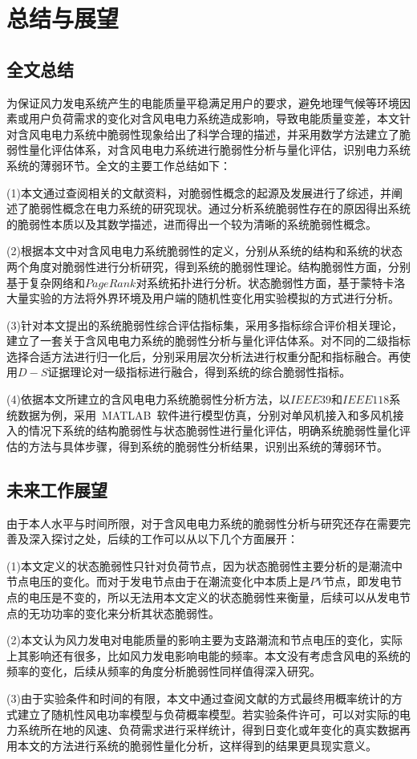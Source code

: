\chapter{总结与展望}
\label{cha:summery}

\section{全文总结}
\label{sec:sum}
为保证风力发电系统产生的电能质量平稳满足用户的要求，避免地理气候等环境因素或用户负荷需求的变化对含风电电力系统造成影响，导致电能质量变差，本文针对含风电电力系统中脆弱性现象给出了科学合理的描述，并采用数学方法建立了脆弱性量化评估体系，对含风电电力系统进行脆弱性分析与量化评估，识别电力系统系统的薄弱环节。全文的主要工作总结如下：

(1)本文通过查阅相关的文献资料，对脆弱性概念的起源及发展进行了综述，并阐述了脆弱性概念在电力系统的研究现状。通过分析系统脆弱性存在的原因得出系统的脆弱性本质以及其数学描述，进而得出一个较为清晰的系统脆弱性概念。

(2)根据本文中对含风电电力系统脆弱性的定义，分别从系统的结构和系统的状态两个角度对脆弱性进行分析研究，得到系统的脆弱性理论。结构脆弱性方面，分别基于复杂网络和$PageRank$对系统拓扑进行分析。状态脆弱性方面，基于蒙特卡洛大量实验的方法将外界环境及用户端的随机性变化用实验模拟的方式进行分析。

(3)针对本文提出的系统脆弱性综合评估指标集，采用多指标综合评价相关理论，建立了一套关于含风电电力系统的脆弱性分析与量化评估体系。对不同的二级指标选择合适方法进行归一化后，分别采用层次分析法进行权重分配和指标融合。再使用$D-S$证据理论对一级指标进行融合，得到系统的综合脆弱性指标。

(4)依据本文所建立的含风电电力系统脆弱性分析方法，以$IEEE39$和$IEEE118$系统数据为例，采用~MATLAB~软件进行模型仿真，分别对单风机接入和多风机接入的情况下系统的结构脆弱性与状态脆弱性进行量化评估，明确系统脆弱性量化评估的方法与具体步骤，得到系统的脆弱性分析结果，识别出系统的薄弱环节。

\section{未来工作展望}
\label{sec:feature}
由于本人水平与时间所限，对于含风电电力系统的脆弱性分析与研究还存在需要完善及深入探讨之处，后续的工作可以从以下几个方面展开：

(1)本文定义的状态脆弱性只针对负荷节点，因为状态脆弱性主要分析的是潮流中节点电压的变化。而对于发电节点由于在潮流变化中本质上是$PV$节点，即发电节点的电压是不变的，所以无法用本文定义的状态脆弱性来衡量，后续可以从发电节点的无功功率的变化来分析其状态脆弱性。

(2)本文认为风力发电对电能质量的影响主要为支路潮流和节点电压的变化，实际上其影响还有很多，比如风力发电影响电能的频率。本文没有考虑含风电的系统的频率的变化，后续从频率的角度分析脆弱性同样值得深入研究。

(3)由于实验条件和时间的有限，本文中通过查阅文献的方式最终用概率统计的方式建立了随机性风电功率模型与负荷概率模型。若实验条件许可，可以对实际的电力系统所在地的风速、负荷需求进行采样统计，得到日变化或年变化的真实数据再用本文的方法进行系统的脆弱性量化分析，这样得到的结果更具现实意义。
